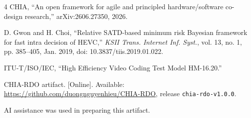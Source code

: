 \documentclass[journal]{IEEEtran}
\newcommand{\project}{\textsc{CHIA-RDO}\xspace}
\begin{document}
\begin{thebibliography}{4}
CHIA, ``An open framework for agile and principled hardware/software co-design
research,'' arXiv:2606.27350, 2026.

D. Gwon and H. Choi, ``Relative SATD-based minimum risk Bayesian framework for
fast intra decision of HEVC,'' \emph{KSII Trans. Internet Inf. Syst.}, vol. 13,
no. 1, pp. 385--405, Jan. 2019, doi: 10.3837/tiis.2019.01.022.

ITU-T/ISO/IEC, ``High Efficiency Video Coding Test Model HM-16.20.''

\project artifact. [Online]. Available:
\url{https://github.com/duongnguyenhieu/CHIA-RDO}, release
\texttt{chia-rdo-v1.0.0}.
\end{thebibliography}

\noindent\footnotesize AI assistance was used in preparing this artifact.
\end{document}
